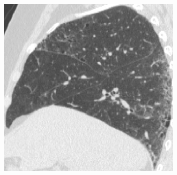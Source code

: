 {\begin{figure}[htbp] 
\centering
\begin{subfigure}{.25\linewidth}%
  \includegraphics[width=\linewidth,trim={{.0\wd0} {.0\wd0} {.0\wd0} {.0\wd0}},clip]{Segmentation/Image/IPF203_Raw_Sagittal161.png}

\end{subfigure}
\end{figure}}

